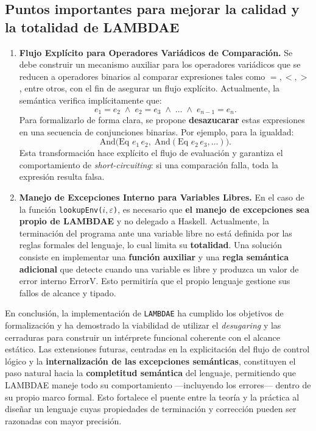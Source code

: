 \documentclass[a4paper,12pt]{article}
\begin{document}
\begin{tcolorbox}[title= Conclusiones     MÓDULO D3, breakable]
\section*{Puntos importantes para mejorar la calidad y la totalidad de LAMBDAE}

\begin{enumerate}
    \item \textbf{Flujo Explícito para Operadores Variádicos de Comparación.}  
    Se debe construir un mecanismo auxiliar para los operadores variádicos que se reducen a operadores binarios al comparar expresiones tales como $=, <, >$, entre otros, con el fin de asegurar un flujo explícito. Actualmente, la semántica verifica implícitamente que:
    \[
        e_{1} = e_{2} \;\wedge\; e_{2} = e_{3} \;\wedge\; \dots \;\wedge\; e_{n-1} = e_{n}.
    \]
    Para formalizarlo de forma clara, se propone \textbf{desazucarar} estas expresiones en una secuencia de conjunciones binarias. Por ejemplo, para la igualdad:
    \[
        \text{And}\big(\text{Eq } e_{1}\, e_{2},\; \text{And}(\text{Eq } e_{2}\, e_{3},\dots )\big).
    \]
    Esta transformación hace explícito el flujo de evaluación y garantiza el comportamiento de \textit{short-circuiting}: si una comparación falla, toda la expresión resulta falsa.

    \item \textbf{Manejo de Excepciones Interno para Variables Libres.}  
    En el caso de la función \texttt{lookupEnv(}$i, \varepsilon$\texttt{)}, es necesario que \textbf{el manejo de excepciones sea propio de LAMBDAE} y no delegado a Haskell. Actualmente, la terminación del programa ante una variable libre no está definida por las reglas formales del lenguaje, lo cual limita su \textbf{totalidad}.  
    Una solución consiste en implementar una \textbf{función auxiliar} y una \textbf{regla semántica adicional} que detecte cuando una variable es libre y produzca un valor de error interno $\text{ErrorV}$. Esto permitiría que el propio lenguaje gestione sus fallos de alcance y tipado.
\end{enumerate}

\noindent
En conclusión, la implementación de \texttt{LAMBDAE} ha cumplido los objetivos de formalización y ha demostrado la viabilidad de utilizar el \textit{desugaring} y las cerraduras para construir un intérprete funcional coherente con el alcance estático. Las extensiones futuras, centradas en la explicitación del flujo de control lógico y la \textbf{internalización de las excepciones semánticas}, constituyen el paso natural hacia la \textbf{completitud semántica} del lenguaje, permitiendo que LAMBDAE maneje todo su comportamiento —incluyendo los errores— dentro de su propio marco formal. Esto fortalece el puente entre la teoría y la práctica al diseñar un lenguaje cuyas propiedades de terminación y corrección pueden ser razonadas con mayor precisión.


\end{tcolorbox}
\end{document}
